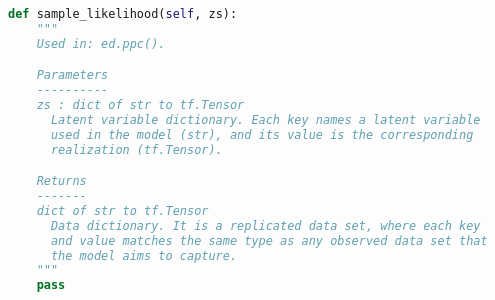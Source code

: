 \begin{lstlisting}[language=Python]
  def sample_likelihood(self, zs):
    """
    Used in: ed.ppc().

    Parameters
    ----------
    zs : dict of str to tf.Tensor
      Latent variable dictionary. Each key names a latent variable
      used in the model (str), and its value is the corresponding
      realization (tf.Tensor).

    Returns
    -------
    dict of str to tf.Tensor
      Data dictionary. It is a replicated data set, where each key
      and value matches the same type as any observed data set that
      the model aims to capture.
    """
    pass
\end{lstlisting}
